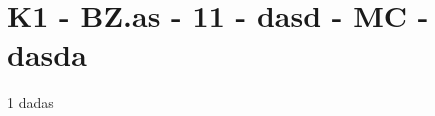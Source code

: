 \section{K1 - BZ.as - 11 - dasd - MC - dasda}

\begin{langesbeispiel} \item[1] %
dadas
\end{langesbeispiel}